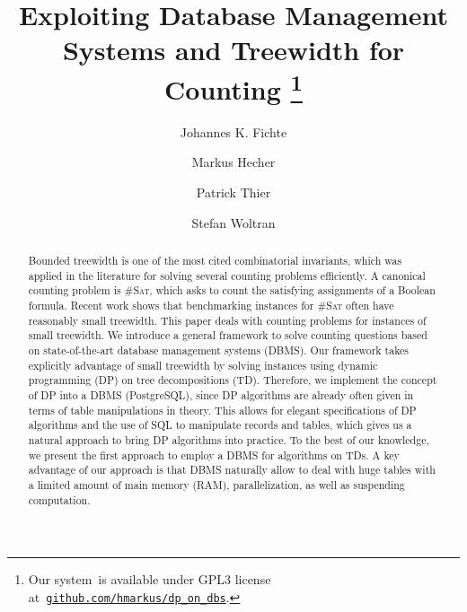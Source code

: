 \documentclass{llncs}
\title{Exploiting Database Management Systems and Treewidth for Counting%
  \thanks{%
    Our system~\dpdb is available under GPL3 license
    at~\href{https://github.com/hmarkus/dp_on_dbs/releases/tag/TODOv1.001-pre}{\nolinkurl{github.com/hmarkus/dp_on_dbs}}.
  }%
%
}
\author{Johannes K. Fichte\inst{1}\orcidID{0000-0002-8681-7470}%
  \and Markus Hecher\inst{2,3}\orcidID{0000-0003-0131-6771} 
  \and Patrick Thier\inst{2}%
  \and Stefan Woltran\inst{2}\orcidID{0000-0003-1594-8972}
}%
\institute{TU Dresden, %
  Germany \email{johannes.fichte@tu-dresden.de} %
  \and TU Wien, %
  Austria \email{\{hecher,woltran,thier\}@dbai.tuwien.ac.at} \and %
  University of
  Potsdam, %
  Germany \email{hecher@uni-potsdam.de}
%
%
%
%
}
\newcommand{\cSAT}{\textsc{\#Sat}\xspace}%
\begin{document}
\maketitle

\begin{abstract}
Bounded treewidth is one of the most cited combinatorial invariants, which was applied in the literature for solving several counting problems efficiently. 
A canonical counting problem is \cSAT, which asks to count the satisfying assignments of a Boolean formula. Recent work shows that benchmarking instances for \cSAT often have reasonably small treewidth. %
This paper deals with counting problems for instances of small treewidth. We introduce a general framework to solve counting questions based on state-of-the-art database management systems (DBMS). Our framework takes explicitly advantage of small treewidth by solving instances using dynamic programming (DP) on tree decompositions (TD). Therefore, we implement the concept of DP into a DBMS (PostgreSQL), since DP algorithms are already often given in terms of table manipulations in theory. This allows for elegant specifications of DP algorithms and the use of SQL to manipulate records and tables, which gives us a natural approach to bring DP algorithms into practice. To the best of our knowledge, we present the first
approach to employ a DBMS for algorithms on TDs. A key advantage of our approach is that DBMS naturally allow to deal with huge tables with a limited amount of main memory (RAM), parallelization, as well as suspending %
computation.
\end{abstract}
\end{document}
